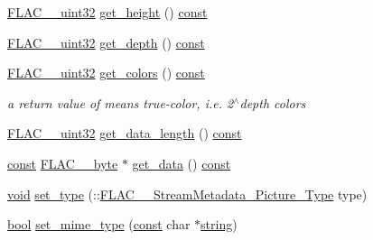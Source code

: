 \begin{DoxyCompactItemize}
\item 
\hyperlink{ordinals_8h_a9c4005ea7ef8d564b0cc993cdd0e4e5e}{F\+L\+A\+C\+\_\+\+\_\+uint32} \hyperlink{class_f_l_a_c_1_1_metadata_1_1_picture_aee936ce3397a425b6f2ba7c3f799e58e}{get\+\_\+height} () \hyperlink{getopt1_8c_a2c212835823e3c54a8ab6d95c652660e}{const} 
\item 
\hyperlink{ordinals_8h_a9c4005ea7ef8d564b0cc993cdd0e4e5e}{F\+L\+A\+C\+\_\+\+\_\+uint32} \hyperlink{class_f_l_a_c_1_1_metadata_1_1_picture_a3ac831c0d0da1b9bf719fea7fd51fd8b}{get\+\_\+depth} () \hyperlink{getopt1_8c_a2c212835823e3c54a8ab6d95c652660e}{const} 
\item 
\hyperlink{ordinals_8h_a9c4005ea7ef8d564b0cc993cdd0e4e5e}{F\+L\+A\+C\+\_\+\+\_\+uint32} \hyperlink{class_f_l_a_c_1_1_metadata_1_1_picture_ab2dd65f7673b3fd167c79125ea013685}{get\+\_\+colors} () \hyperlink{getopt1_8c_a2c212835823e3c54a8ab6d95c652660e}{const} 
\begin{DoxyCompactList}\small\item\em a return value of {} means true-\/color, i.\+e. 2$^\wedge$depth colors \end{DoxyCompactList}\item 
\hyperlink{ordinals_8h_a9c4005ea7ef8d564b0cc993cdd0e4e5e}{F\+L\+A\+C\+\_\+\+\_\+uint32} \hyperlink{class_f_l_a_c_1_1_metadata_1_1_picture_a5b2af32824aad6d1853661e0896d8bff}{get\+\_\+data\+\_\+length} () \hyperlink{getopt1_8c_a2c212835823e3c54a8ab6d95c652660e}{const} 
\item 
\hyperlink{getopt1_8c_a2c212835823e3c54a8ab6d95c652660e}{const} \hyperlink{ordinals_8h_a5eb569b12d5b047cdacada4d57924ee3}{F\+L\+A\+C\+\_\+\+\_\+byte} $\ast$ \hyperlink{class_f_l_a_c_1_1_metadata_1_1_picture_aa673db555d0af94e6ecffde9d769baea}{get\+\_\+data} () \hyperlink{getopt1_8c_a2c212835823e3c54a8ab6d95c652660e}{const} 
\item 
\hyperlink{sound_8c_ae35f5844602719cf66324f4de2a658b3}{void} \hyperlink{class_f_l_a_c_1_1_metadata_1_1_picture_a969278ad1b2570b754d8226aec40c320}{set\+\_\+type} (\+::\hyperlink{group__flac__format_gaf6d3e836cee023e0b8d897f1fdc9825d}{F\+L\+A\+C\+\_\+\+\_\+\+Stream\+Metadata\+\_\+\+Picture\+\_\+\+Type} type)
\item 
\hyperlink{mac_2config_2i386_2lib-src_2libsoxr_2soxr-config_8h_abb452686968e48b67397da5f97445f5b}{bool} \hyperlink{class_f_l_a_c_1_1_metadata_1_1_picture_afb4e53cb8ae62ea0d9ebd1afdca40c3f}{set\+\_\+mime\+\_\+type} (\hyperlink{getopt1_8c_a2c212835823e3c54a8ab6d95c652660e}{const} char $\ast$\hyperlink{test__lib_f_l_a_c_2format_8c_ab02026ad0de9fb6c1b4233deb0a00c75}{string})

\end{DoxyCompactItemize}
